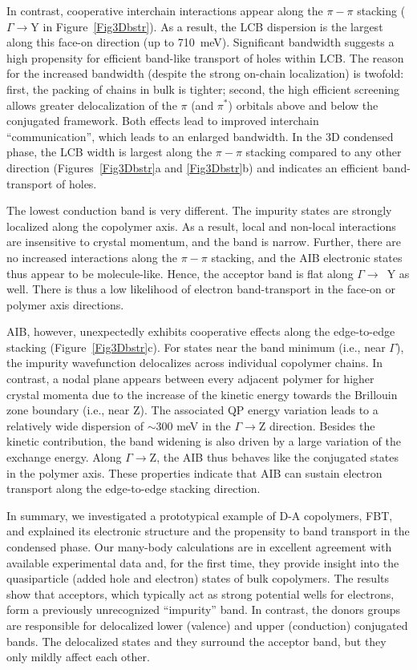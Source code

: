 \documentclass[journal = jpclcd]{achemso}
\begin{document}
In contrast, cooperative interchain interactions appear along the $\pi-\pi$ stacking  ($\Gamma \to$Y in Figure~\ref{Fig3Dbstr}). As a result, the LCB dispersion is the largest along this face-on direction  (up to 710~meV). Significant bandwidth suggests a high propensity for efficient band-like transport of holes within LCB. The reason for the increased bandwidth (despite the strong on-chain localization) is twofold: first, the packing of chains in bulk is tighter; second, the high efficient screening allows greater delocalization of the $\pi$ (and $\pi^*$) orbitals above and below the conjugated framework. Both effects lead to improved interchain ``communication'', which leads to an enlarged bandwidth. In the 3D condensed phase, the LCB width is largest along the $\pi-\pi$ stacking compared to any other direction (Figures~\ref{Fig3Dbstr}a and \ref{Fig3Dbstr}b) and indicates an efficient band-transport of holes.

The lowest conduction band is very different. The impurity states are strongly localized along the copolymer axis. As a result, local and non-local interactions are insensitive to crystal momentum, and the band is narrow. Further, there are no increased interactions along the $\pi-\pi$ stacking, and the AIB electronic states thus appear to be molecule-like. Hence, the acceptor band is  flat along $\Gamma\to$~Y as well. There is thus a low likelihood of electron band-transport in the face-on or polymer axis directions. 

AIB, however, unexpectedly exhibits cooperative effects along the edge-to-edge stacking (Figure~\ref{Fig3Dbstr}c). For states near the band minimum (i.e., near $\Gamma$), the impurity wavefunction delocalizes across individual copolymer chains. In contrast, a nodal plane appears between every adjacent polymer for higher crystal momenta due to the increase of the kinetic energy towards the Brillouin zone boundary (i.e., near Z).  The associated QP energy variation leads to a relatively wide\cite{dispersion} dispersion of $\sim$300 meV in the $\Gamma\to$Z direction. Besides the kinetic contribution, the band widening is also driven by a large variation of the exchange energy. Along $\Gamma\to$Z,  the AIB thus behaves like the conjugated states in the polymer axis. These properties indicate that AIB can sustain electron transport along the edge-to-edge stacking direction.

In summary, we investigated a prototypical example of D-A copolymers, FBT, and explained its electronic structure and the propensity to band transport in the condensed phase. Our many-body calculations are in excellent agreement with available experimental data and, for the first time, they provide insight into the quasiparticle (added hole and electron) states of bulk copolymers. The results show that acceptors, which typically act as strong potential wells for electrons, form a previously unrecognized ``impurity'' band. In contrast, the donors groups are responsible for delocalized lower (valence) and upper (conduction) conjugated bands. The delocalized states and they surround the acceptor band, but they only mildly affect each other.
\end{document}
